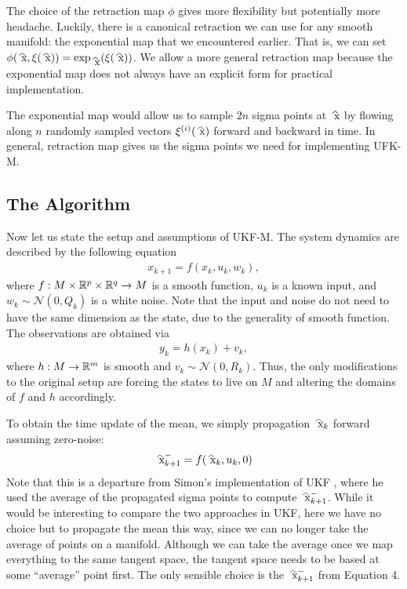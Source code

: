 \documentclass[12pt]{article}
\begin{document}
The choice of the retraction map $ \phi$ gives more flexibility but potentially more headache. Luckily, there is a canonical retraction we can use for any smooth manifold: the exponential map that we encountered earlier. That is, we can set $ \phi(\wh{ x}, \xi(\wh{ x})) = \exp_{\wh{ x}}(\xi(\wh{ x}))$. We allow a more general retraction map because the exponential map does not always have an explicit form for practical implementation.

The exponential map would allow us to sample $ 2n$ sigma points at $ \wh{ x}$ by flowing along $ n$ randomly sampled vectors $ \xi^{(i)}(\wh{ x})$ forward and backward in time. In general, retraction map gives us the sigma points we need for implementing UFK-M.

\subsection{The Algorithm}
Now let us state the setup and assumptions of UKF-M. The system dynamics are described by the following equation
\begin{align}
	x_{k+1} = f(x_k, u_k, w_k),
\end{align}
where $ f:M \times \mathbb{R}^{p} \times \mathbb{R}^{q} \to M$ is a smooth function, $ u_k$ is a known input, and $ w_k \sim \mathcal{ N}(0,Q_k)$ is a white noise. Note that the input and noise do not need to have the same dimension as the state, due to the generality of smooth function. The observations are obtained via
\begin{align}
	y_{k} = h(x_k) + v_k,
\end{align}
where $ h: M \to \mathbb{R}^{m}$ is smooth and $ v_k \sim \mathcal{ N}(0, R_k)$. Thus, the only modifications to the original setup are forcing the states to live on $ M$ and altering the domains of $ f$ and  $ h$ accordingly. 

To obtain the time update of the mean, we simply propagation $ \wh{ x}_k$ forward assuming zero-noise:
\begin{align}
	 \wh{ x}_{k+1}^{-} = f(\wh{ x}_k,u_k,0)
\end{align}
Note that this is a departure from Simon's implementation of UKF \cite{}, where he used the average of the propagated sigma points to compute $ \wh{ x}_{k+1}^{-}$. While it would be interesting to compare the two approaches in UKF, here we have no choice but to propagate the mean this way, since we can no longer take the average of points on a manifold. Although we can take the average once we map everything to the same tangent space, the tangent space needs to be based at some ``average'' point first. The only sensible choice is the $ \wh{ x}_{k+1}^{-}$ from Equation 4.
\end{document}
